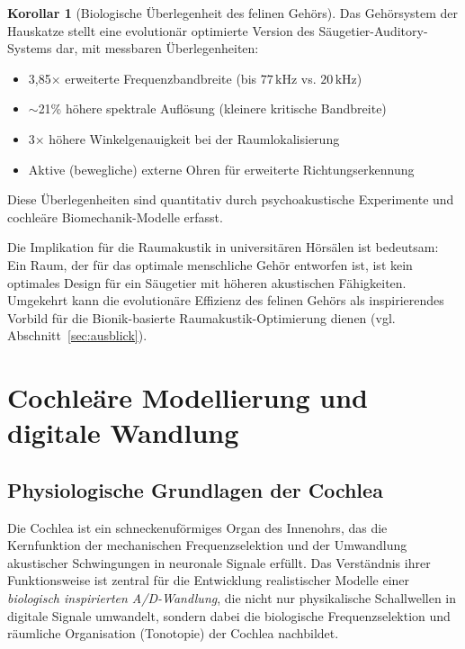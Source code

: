 ﻿\documentclass[12pt, a4paper]{article}
\theoremstyle{definition}
\newtheorem{korollar}{Korollar}[section]
\theoremstyle{remark}
\begin{document}
\begin{korollar}[Biologische Überlegenheit des felinen Gehörs]
Das Gehörsystem der Hauskatze stellt eine evolutionär optimierte Version des Säugetier-Auditory-Systems dar, mit messbaren Überlegenheiten:
\begin{itemize}
\item 3,85$\times$ erweiterte Frequenzbandbreite (bis $77\,\mathrm{kHz}$ vs. $20\,\mathrm{kHz}$)
\item $\sim$21\% höhere spektrale Auflösung (kleinere kritische Bandbreite)
\item 3$\times$ höhere Winkelgenauigkeit bei der Raumlokalisierung
\item Aktive (bewegliche) externe Ohren für erweiterte Richtungserkennung
\end{itemize}

Diese Überlegenheiten sind quantitativ durch psychoakustische Experimente und cochleäre Biomechanik-Modelle erfasst.
\end{korollar}

Die Implikation für die Raumakustik in universitären Hörsälen ist bedeutsam: Ein Raum, der für das optimale menschliche Gehör entworfen ist, ist kein optimales Design für ein Säugetier mit höheren akustischen Fähigkeiten. Umgekehrt kann die evolutionäre Effizienz des felinen Gehörs als inspirierendes Vorbild für die Bionik-basierte Raumakustik-Optimierung dienen (vgl. Abschnitt~\ref{sec:ausblick}).

\section{Cochleäre Modellierung und digitale Wandlung}
\label{sec:cochlear}

\subsection{Physiologische Grundlagen der Cochlea}

Die Cochlea ist ein schneckenuförmiges Organ des Innenohrs, das die Kernfunktion 
der mechanischen Frequenzselektion und der Umwandlung akustischer Schwingungen 
in neuronale Signale erfüllt. Das Verständnis ihrer Funktionsweise ist zentral 
für die Entwicklung realistischer Modelle einer \textit{biologisch inspirierten 
A/D-Wandlung}, die nicht nur physikalische Schallwellen in digitale Signale 
umwandelt, sondern dabei die biologische Frequenzselektion und räumliche 
Organisation (Tonotopie) der Cochlea nachbildet.
\end{document}
